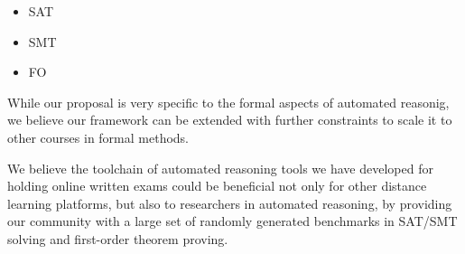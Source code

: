 \begin{itemize}
\item SAT
\item SMT
\item FO
\end{itemize}
While our proposal is very specific to the formal aspects of automated
reasonig, we believe our framework can be extended with further
constraints to scale it to other courses in formal methods. 


We believe the toolchain of automated reasoning tools we have developed for
holding online written exams could be beneficial not only for other
distance learning platforms, but also to researchers in automated
reasoning, by providing our community with a large set of randomly generated benchmarks in SAT/SMT solving and first-order theorem proving.


